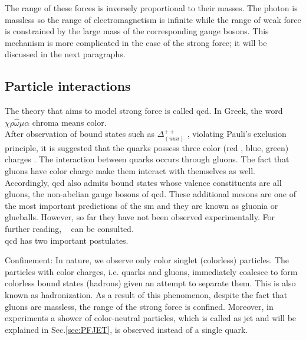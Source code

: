 The range of these forces is inversely proportional to their masses. The photon is massless so the range of electromagnetism is infinite while the range of weak force is constrained by the large mass of the corresponding gauge bosons. This mechanism is more complicated in the case of the strong force; it will be discussed in the next paragraphs.

\subsection{Particle interactions}
\label{sec:StandardModelParticleInteractions}

The theory that aims to model strong force is called \acrfull{qcd}. In Greek, the word $\chi\rho\hat{\omega}\mu\alpha$ chroma means color.\\
After observation of bound states such as $\Delta^{++}_{(uuu)}$ \cite{Dbaryons1,Dbaryons2}, violating Pauli\textquoteright s exclusion principle, it is suggested that the quarks possess three color (red , blue, green) charges \cite{GMann, GMann1}. The interaction between quarks occurs through gluons. The fact that gluons have color charge make them interact with themselves as well. Accordingly, \acrshort{qcd} also admits bound states whose valence constituents are all gluons, the non-abelian gauge bosons of \acrshort{qcd}. These additional mesons are one of the most important predictions of the \acrshort{sm} and they are known as gluonia or glueballs. However, so far they have not been observed experimentally. For further reading, ~\cite{glueball1, glueball2} can be consulted.\\
\acrshort{qcd} has two important postulates.

Confinement:
In nature, we observe only color singlet (colorless) particles. The particles with color charges, i.e. quarks and gluons, immediately coalesce to form colorless bound states (hadrons) given an attempt to separate them. This is also known as hadronization. As a result of this phenomenon, despite the fact that gluons are massless, the range of the strong force is confined. Moreover, in experiments a shower of color-neutral particles, which is called as jet and will be explained in Sec.\ref{sec:PFJET}, is observed instead of a single quark.

